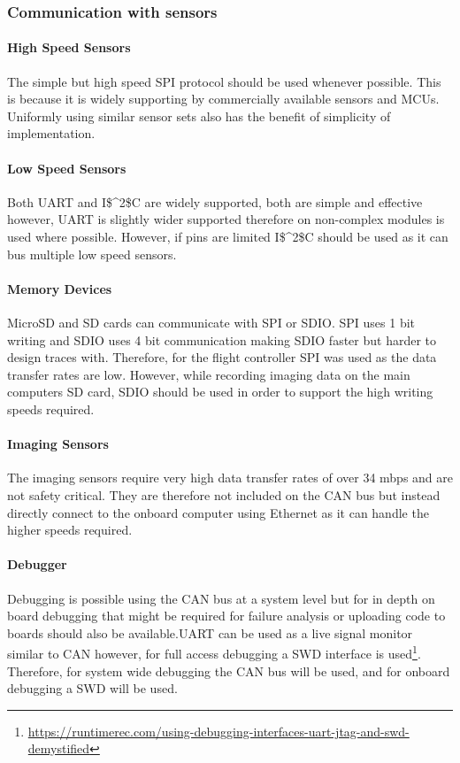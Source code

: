 \subsubsection{Communication with sensors}
\paragraph{High Speed Sensors}
The simple but high speed \gls{SPI} protocol should be used whenever possible. This is because it is widely supporting by commercially available sensors and \gls{MCU}s. Uniformly using similar sensor sets also has the benefit of simplicity of implementation.
\paragraph{Low Speed Sensors}
Both \gls{UART} and \gls{I$^2$C} are widely supported, both are simple and effective however, \gls{UART} is slightly wider supported therefore on non-complex modules is used where possible. However, if pins are limited \gls{I$^2$C} should be used as it can bus multiple low speed sensors.
\paragraph{Memory Devices}
MicroSD and SD cards can communicate with \gls{SPI} or \gls{SDIO}. \gls{SPI} uses 1 bit writing and \gls{SDIO} uses 4 bit communication making \gls{SDIO} faster but harder to design traces with. Therefore, for the flight controller \gls{SPI} was used as the data transfer rates are low. However, while recording imaging data on the main computers SD card, \gls{SDIO} should be used in order to support the high writing speeds required. 
\paragraph{Imaging Sensors}
The imaging sensors require very high data transfer rates of over 34 mbps and are not safety critical. They are therefore not included on the \gls{CAN} bus but instead directly connect to the onboard computer using Ethernet as it can handle the higher speeds required.
\paragraph{Debugger}
Debugging is possible using the \gls{CAN} bus at a system level but for in depth on board debugging that might be required for failure analysis or uploading code to boards should also be available.\gls{UART} can be used as a live signal monitor similar to CAN however, for full access debugging a \gls{SWD} interface is used\footnote{\url{https://runtimerec.com/using-debugging-interfaces-uart-jtag-and-swd-demystified}}. Therefore, for system wide debugging the \gls{CAN} bus will be used, and for onboard debugging a \gls{SWD} will be used.
